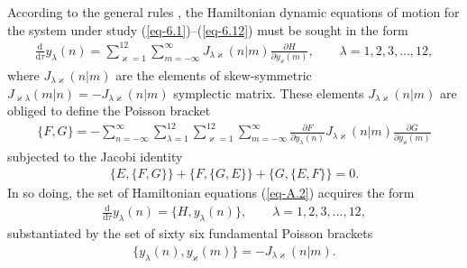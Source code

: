 \documentclass[pdftex]{sigma}
\numberwithin{equation}{section}
\begin{document}
According to the general rules \cite{maschke-JFI-329-923, torres-del-castillo-RMF-50-608}, the Hamiltonian dynamic equations of motion for the system under study (\ref{eq-6.1})--(\ref{eq-6.12}) must be sought in the form
\begin{gather}\label{eq-A.2}
	\frac{\mathrm{d}}{\mathrm{d}\tau}y_\lambda(n) = \sum_{\varkappa=1}^{12} \sum_{m=-\infty}^\infty J_{\lambda\varkappa}(n|m)
	\frac{\partial H}{\partial y_{\varkappa}(m)},\qquad \lambda = 1, 2, 3, \dots, 12 ,
\end{gather}
where $J_{\lambda\varkappa}(n|m)$ are the elements of skew-symmetric $J_{\varkappa\lambda}(m|n)=-J_{\lambda\varkappa}(n|m)$ symplectic matrix. These elements $J_{\lambda\varkappa}(n|m)$ are obliged to define the Poisson bracket
\begin{gather}\label{eq-A.3}
	\{F,G\} = -\sum_{n=-\infty}^\infty \sum_{\lambda=1}^{12} \sum_{\varkappa=1}^{12} \sum_{m=-\infty}^\infty \frac{\partial F}{\partial y_{\lambda}(n)} J_{\lambda\varkappa}(n|m) \frac{\partial G}{\partial y_{\varkappa}(m)}
\end{gather}
subjected to the Jacobi identity
\begin{gather}\label{eq-A.4}
	\{E,\{F,G \} \} +\{F,\{G,E \} \} +\{G,\{E,F \} \}=0 .
\end{gather}
In so doing, the set of Hamiltonian equations (\ref{eq-A.2}) acquires the form
\begin{gather}\label{eq-A.5}
	\frac{\mathrm{d}}{\mathrm{d}\tau}y_\lambda(n) = \{H, y_{\lambda}(n)\},\qquad \lambda = 1, 2, 3, \dots , 12,
\end{gather}
substantiated by the set of sixty six fundamental Poisson brackets
\begin{gather}\label{eq-A.6}
\{ y_{\lambda}(n), y_{\varkappa}(m)\} = - J_{\lambda\varkappa}(n|m) .
\end{gather}
\end{document}
